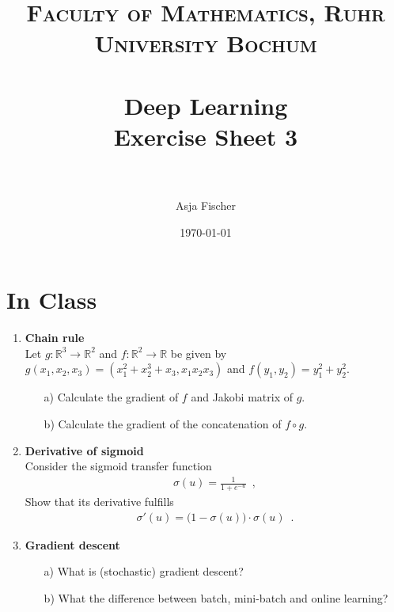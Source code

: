 \documentclass[paper=a4, fontsize=11pt]{scrartcl} %
\title{	
\normalfont \normalsize 
\textsc{Faculty of Mathematics, Ruhr University Bochum} \\ [25pt] %
\horrule{0.5pt} \\[0.4cm] %
\huge Deep Learning\\{\Large Exercise Sheet 3}\\ %
\horrule{2pt} \\[0.5cm] %
}
\author{Asja Fischer} %
\date{\normalsize\today} %
\numberwithin{equation}{section} %
\numberwithin{figure}{section} %
\numberwithin{table}{section} %
\begin{document}
\maketitle %
\section{In Class}
\begin{enumerate} 

\item \textbf{Chain rule}\\
Let $g: \mathbb{R}^3 \to \mathbb{R}^2$ and $f: \mathbb{R}^2 \to \mathbb{R}$ be given by $g(x_1, x_2, x_3)=(x_1^2+x_2^3+x_3, x_1x_2x_3)$ and $f(y_1, y_2)=y_1^2+y_2^2$.
\begin{itemize}
\item[a)] Calculate the gradient of $f$ and Jakobi matrix of $g$.
\item[b)] Calculate the gradient of the concatenation of $f \circ g$.
\end{itemize} 



\item \textbf{Derivative of sigmoid}\\
Consider the sigmoid transfer function
\begin{align*}
   \sigma(u) = \frac{1}{1 + e^{-u}} \enspace,
 \end{align*}
 Show that its derivative fulfills
 \begin{align*}
    \sigma'(u) = \big( 1 - \sigma(u) \big) \cdot \sigma(u) \enspace.
   \end{align*}
   
   
\item  \textbf{Gradient descent} \\
\begin{itemize}
\item[a)] What is (stochastic) gradient descent?
\item[b)] What the difference between batch, mini-batch and online learning?
\end{itemize}


\end{enumerate}
\end{document}
